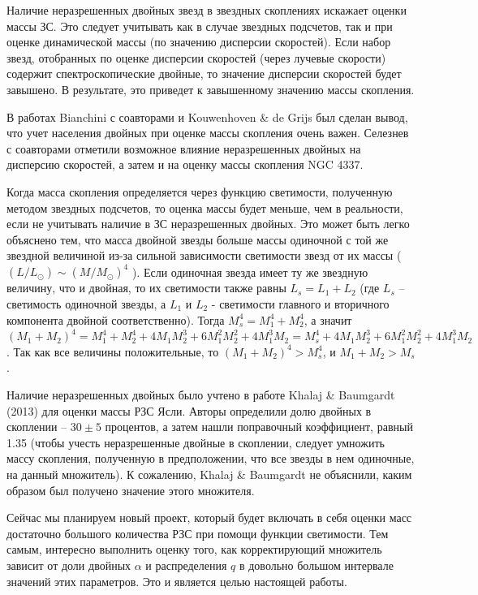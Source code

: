 \documentclass[a4paper,12pt]{article}
\begin{document}
Наличие неразрешенных двойных звезд в звездных скоплениях искажает оценки массы ЗС. Это следует учитывать как в случае звездных подсчетов, так и при оценке динамической массы (по значению дисперсии скоростей). Если набор звезд, отобранных по  оценке дисперсии скоростей (через лучевые скорости) содержит спектроскопические двойные, то значение дисперсии скоростей будет завышено. В результате, это приведет к завышенному значению массы скопления.

В работах Bianchini с соавторами \cite{Bianchini} и Kouwenhoven \& de Grijs \cite{KdeG} был сделан вывод, что учет населения двойных при оценке массы скопления очень важен. Селезнев с соавторами \cite{4337} отметили возможное влияние неразрешенных двойных на дисперсию скоростей, а затем и на оценку массы скопления NGC 4337.

Когда масса скопления определяется через функцию светимости, полученную методом звездных подсчетов, то оценка массы будет меньше, чем в реальности, если не учитывать наличие в ЗС неразрешенных двойных. Это может быть легко объяснено тем, что масса двойной звезды больше массы одиночной с той же звездной величиной из-за сильной зависимости светимости звезд от их массы ($(L/L_{\odot})\sim(M/M_{\odot})^4$ \cite{CO}). 
Если одиночная звезда имеет ту же звездную величину, что и двойная, то их светимости также равны $L_s=L_1+L_2$ (где $L_s$ -- светимость одиночной звезды, а  $L_1$ и $L_2$ - светимости главного и вторичного компонента двойной соответственно). Тогда $M_s^4=M_1^4+M_2^4$, а значит $(M_1+M_2)^4=M_1^4+M_2^4+4M_1M_2^3+6M_1^2M_2^2+4M_1^3M_2=M_s^4+4M_1M_2^3+6M_1^2M_2^2+4M_1^3M_2$.
 Так как все величины положительные, то $(M_1+M_2)^4>M_s^4$, и $M_1+M_2>M_s$.
 
 Наличие неразрешенных двойных было учтено в работе Khalaj \& Baumgardt (2013) \cite{Khalaj} для оценки массы РЗС Ясли. Авторы определили долю двойных в скоплении -- $30\pm5$ процентов, а затем нашли поправочный коэффициент, равный 1.35 (чтобы учесть неразрешенные двойные в скоплении, следует умножить массу скопления, полученную в предположении, что все звезды в нем одиночные, на данный множитель). 
К сожалению, Khalaj \& Baumgardt \cite{Khalaj} не объяснили, каким образом был получено значение этого множителя. 

Сейчас мы планируем новый проект, который будет включать в себя оценки масс достаточно большого количества РЗС при помощи функции светимости. Тем самым, интересно выполнить оценку того, как корректирующий множитель зависит от доли двойных $\alpha$ и распределения $q$ в довольно большом интервале значений этих параметров. Это и является целью настоящей работы.
\end{document}

